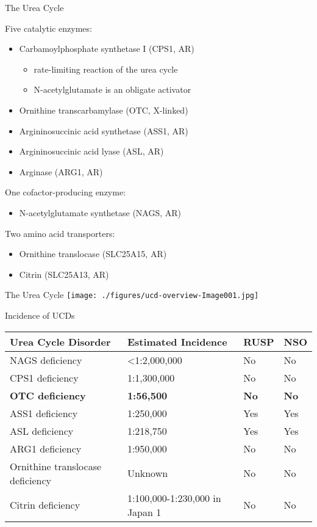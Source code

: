 \documentclass[presentation, smaller]{beamer}
\begin{document}
\begin{frame}[label={sec:orgheadline3}]{The Urea Cycle}
\begin{block}{Five catalytic enzymes:}
\begin{itemize}
\item Carbamoylphosphate synthetase I (CPS1, AR)
\begin{itemize}
\item rate-limiting reaction of the urea cycle
\item N-acetylglutamate is an obligate activator
\end{itemize}
\item Ornithine transcarbamylase (OTC, X-linked)
\item Argininosuccinic acid synthetase (ASS1, AR)
\item Argininosuccinic acid lyase (ASL, AR)
\item Arginase (ARG1, AR)
\end{itemize}
\end{block}
\begin{block}{One cofactor-producing enzyme:}
\begin{itemize}
\item N-acetylglutamate synthetase (NAGS, AR)
\end{itemize}
\end{block}
\begin{block}{Two amino acid transporters:}
\begin{itemize}
\item Ornithine translocase (SLC25A15, AR)
\item Citrin (SLC25A13, AR)
\end{itemize}
\end{block}
\end{frame}


\begin{frame}[label={sec:orgheadline4}]{The Urea Cycle}
\texttt{[image: ./figures/ucd-overview-Image001.jpg]}
\end{frame}

\begin{frame}[label={sec:orgheadline5}]{Incidence of UCDs}
\begin{center}
\begin{tabular}{llll}
Urea Cycle Disorder & Estimated Incidence & RUSP & NSO\\
\hline
NAGS deficiency & <1:2,000,000 & No & No\\
CPS1 deficiency & 1:1,300,000 & No & No\\
\textbf{OTC deficiency} & \textbf{1:56,500} & \textbf{No} & \textbf{No}\\
ASS1 deficiency & 1:250,000 & Yes & Yes\\
ASL deficiency & 1:218,750 & Yes & Yes\\
ARG1 deficiency & 1:950,000 & No & No\\
Ornithine translocase deficiency & Unknown & No & No\\
Citrin deficiency & 1:100,000-1:230,000 in Japan 1 & No & No\\
\end{tabular}
\end{center}
\end{frame}
\end{document}
